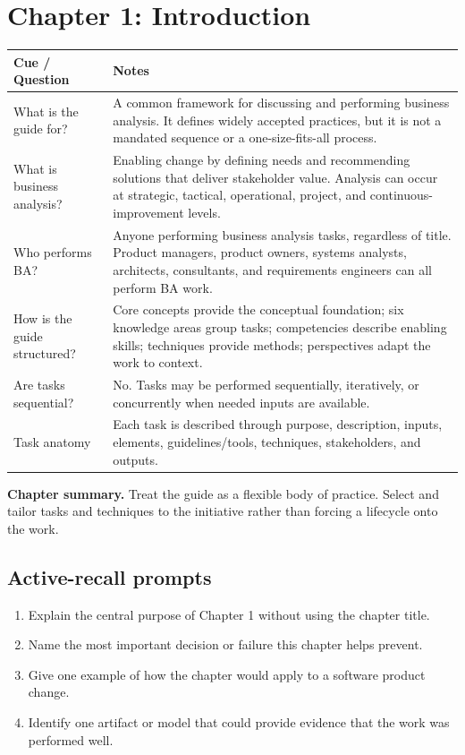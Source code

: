\documentclass[11pt]{article}
\begin{document}
\section{Chapter 1: Introduction}
\begin{longtable}{L{0.26\textwidth} L{0.64\textwidth}}
\toprule
\textbf{Cue / Question} & \textbf{Notes}\\
\midrule
\endhead
What is the guide for? & A common framework for discussing and performing business analysis. It defines widely accepted practices, but it is not a mandated sequence or a one-size-fits-all process.\\
What is business analysis? & Enabling change by defining needs and recommending solutions that deliver stakeholder value. Analysis can occur at strategic, tactical, operational, project, and continuous-improvement levels.\\
Who performs BA? & Anyone performing business analysis tasks, regardless of title. Product managers, product owners, systems analysts, architects, consultants, and requirements engineers can all perform BA work.\\
How is the guide structured? & Core concepts provide the conceptual foundation; six knowledge areas group tasks; competencies describe enabling skills; techniques provide methods; perspectives adapt the work to context.\\
Are tasks sequential? & No. Tasks may be performed sequentially, iteratively, or concurrently when needed inputs are available.\\
Task anatomy & Each task is described through purpose, description, inputs, elements, guidelines/tools, techniques, stakeholders, and outputs.\\
\bottomrule
\end{longtable}
\begin{keybox}\textbf{Chapter summary.} Treat the guide as a flexible body of practice. Select and tailor tasks and techniques to the initiative rather than forcing a lifecycle onto the work.\end{keybox}
\subsection*{Active-recall prompts}
\begin{enumerate}
\item Explain the central purpose of Chapter 1 without using the chapter title.
\item Name the most important decision or failure this chapter helps prevent.
\item Give one example of how the chapter would apply to a software product change.
\item Identify one artifact or model that could provide evidence that the work was performed well.
\end{enumerate}
\end{document}
